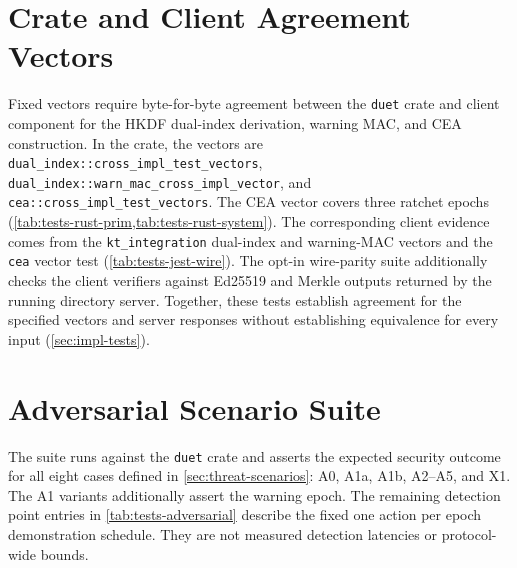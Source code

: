 \section{Crate and Client Agreement Vectors}\label{sec:tests-xlang}

Fixed vectors require byte-for-byte agreement between the \texttt{duet} crate and client component
for the HKDF dual-index derivation, warning MAC, and CEA construction. In the crate, the vectors are
\texttt{dual\_index::cross\_impl\_test\_vectors},
\texttt{dual\_index::warn\_mac\_cross\_impl\_vector}, and
\texttt{cea::cross\_impl\_test\_vectors}. The CEA vector covers three ratchet epochs
(\cref{tab:tests-rust-prim,tab:tests-rust-system}). The corresponding client evidence comes from
the \texttt{kt\_integration} dual-index and warning-MAC vectors and the \texttt{cea} vector test
(\cref{tab:tests-jest-wire}). The opt-in wire-parity suite additionally checks
the client verifiers against Ed25519 and Merkle outputs returned by the running directory server.
Together, these tests establish agreement for the specified vectors and server responses without
establishing equivalence for every input (\cref{sec:impl-tests}).

\section{Adversarial Scenario Suite}\label{sec:tests-adversarial}

The suite runs against the \texttt{duet} crate and asserts the expected security outcome for all
eight cases defined in \cref{sec:threat-scenarios}: A0, A1a, A1b, A2--A5, and X1. The A1 variants
additionally assert the warning epoch. The remaining detection point entries in
\cref{tab:tests-adversarial} describe the fixed one action per epoch demonstration schedule. They
are not measured detection latencies or protocol-wide bounds.

